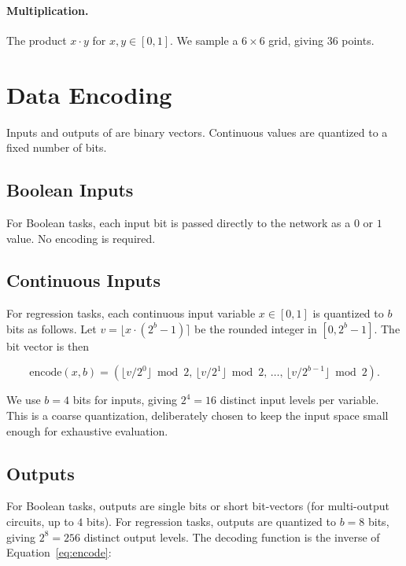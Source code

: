 \paragraph{Multiplication.} The product $x \cdot y$ for $x, y \in [0,1]$.
We sample a $6 \times 6$ grid, giving $36$ points.

\section{Data Encoding}
\label{sec:exp-encoding}

Inputs and outputs of \modnet{} are binary vectors. Continuous values
are quantized to a fixed number of bits.

\subsection{Boolean Inputs}

For Boolean tasks, each input bit is passed directly to the network as
a $0$ or $1$ value. No encoding is required.

\subsection{Continuous Inputs}

For regression tasks, each continuous input variable $x \in [0, 1]$
is quantized to $b$ bits as follows. Let
$v = \lfloor x \cdot (2^b - 1) \rceil$ be the rounded integer in
$[0, 2^b - 1]$. The bit vector is then

\begin{equation}
  \text{encode}(x, b) =
    \left(
      \lfloor v / 2^0 \rfloor \bmod 2,\,
      \lfloor v / 2^1 \rfloor \bmod 2,\,
      \ldots,\,
      \lfloor v / 2^{b-1} \rfloor \bmod 2
    \right).
  \label{eq:encode}
\end{equation}

We use $b = 4$ bits for inputs, giving $2^4 = 16$ distinct input
levels per variable. This is a coarse quantization, deliberately
chosen to keep the input space small enough for exhaustive evaluation.

\subsection{Outputs}

For Boolean tasks, outputs are single bits or short bit-vectors
(for multi-output circuits, up to $4$ bits). For regression tasks,
outputs are quantized to $b = 8$ bits, giving $2^8 = 256$ distinct
output levels. The decoding function is the inverse of
Equation~\ref{eq:encode}:

